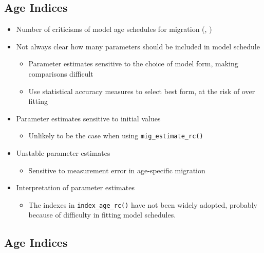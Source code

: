 \documentclass[
]{book}
\providecommand{\tightlist}{%
  \setlength{\itemsep}{0pt}\setlength{\parskip}{0pt}}
\begin{document}
\hypertarget{age-indices-1}{%
\subsection{Age Indices}\label{age-indices-1}}

\begin{itemize}
\tightlist
\item
  Number of criticisms of model age schedules for migration (\citet{Bell2002}, \citet{Bernard2014})
\item
  Not always clear how many parameters should be included in model schedule

  \begin{itemize}
  \tightlist
  \item
    Parameter estimates sensitive to the choice of model form, making comparisons difficult
  \item
    Use statistical accuracy measures to select best form, at the risk of over fitting
  \end{itemize}
\item
  Parameter estimates sensitive to initial values

  \begin{itemize}
  \tightlist
  \item
    Unlikely to be the case when using \texttt{mig\_estimate\_rc()}
  \end{itemize}
\item
  Unstable parameter estimates

  \begin{itemize}
  \tightlist
  \item
    Sensitive to measurement error in age-specific migration
  \end{itemize}
\item
  Interpretation of parameter estimates

  \begin{itemize}
  \tightlist
  \item
    The indexes in \texttt{index\_age\_rc()} have not been widely adopted, probably because of difficulty in fitting model schedules.
  \end{itemize}
\end{itemize}

\hypertarget{age-indices-2}{%
\subsection{Age Indices}\label{age-indices-2}}
\end{document}
